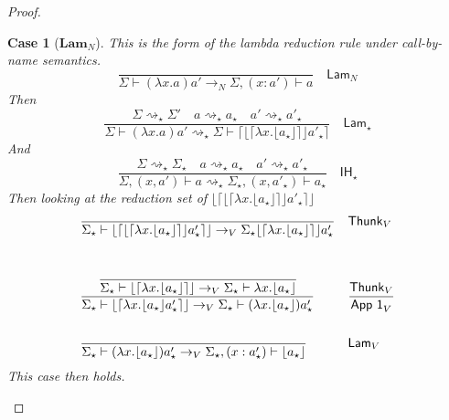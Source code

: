 \documentclass[float=false, crop=false]{standalone}
\newtheorem{case}{Case}
\numberwithin{subcase}{case}
\newcommand{\tlang}{\star}
\newcommand{\thunk}[1]{\lceil #1 \rceil}
\newcommand{\unwrap}[1]{\lfloor #1 \rfloor}
\newcommand{\tcbn}{\rightarrow_N}
\newcommand{\tcbv}{\rightarrow_V}
\newcommand{\tlthunk}{\rightsquigarrow_\tlang}
\begin{document}
\begin{proof}
  \begin{case}[$\mathbf{Lam}_N$]
    This is the form of the lambda reduction rule under call-by-name semantics.
    \[\frac{}{\Sigma \vdash (\lambda x.a)a' \tcbn \Sigma,(x:a') \vdash a }
        \quad \mathsf{Lam}_N\]
    Then \[ \frac{\Sigma \tlthunk \Sigma' \quad 
        a \tlthunk a_\tlang \quad a' \tlthunk a'_\tlang}
      {\Sigma \vdash (\lambda x .a)a' 
        \tlthunk \Sigma \vdash \thunk{\unwrap{
            \thunk{\lambda x. \unwrap{ a_\tlang}}} a'_\tlang} }
              \quad \mathsf{Lam}_\tlang\]
    And \[ \frac{\Sigma \tlthunk \Sigma_\tlang \quad a 
        \tlthunk a_\tlang \quad a' \tlthunk a'_\tlang}
      {\Sigma,(x,a') \vdash a\tlthunk \Sigma_\tlang,
        (x,a'_\tlang) \vdash a_\tlang} \quad \mathsf{IH}_\tlang \]
   Then looking at the reduction set of  
   ${\unwrap{\thunk{\unwrap{
        \thunk{\lambda x. \unwrap{ a_\tlang}}} a'_\tlang}}}$
    \begin{align*}
     &\frac{}{ 
       \Sigma_\tlang \vdash \unwrap{\thunk{\unwrap{\thunk{\lambda x.
               \unwrap{ a_\tlang}}} a'_\tlang}} \tcbv 
       \Sigma_\tlang \unwrap{\thunk{\lambda x.
               \unwrap{ a_\tlang}}} a'_\tlang} && \mathsf{Thunk}_V \\ \\
     &\cfrac{\cfrac{}{\Sigma_\tlang \vdash \unwrap{\thunk{\lambda x.
           \unwrap{ a_\tlang}}} \tcbv  \Sigma_\tlang \vdash \lambda x.
       \unwrap{a_\tlang}}}{ 
       \Sigma_\tlang \vdash \unwrap{\thunk{\lambda x.
               \unwrap{ a_\tlang} a'_\tlang}} \tcbv 
           \Sigma_\tlang \vdash (\lambda x.\unwrap{a_\tlang}) a'_\tlang} && 
         \frac{\mathsf{Thunk}_V}{\mathsf{App\ 1}_V}\\ \\
     &\frac{}{\Sigma_\tlang \vdash (\lambda x.\unwrap{a_\tlang})a'_\tlang \tcbv 
       \Sigma_\tlang, (x:a_\tlang') \vdash \unwrap{a_\tlang}} && \mathsf{Lam}_V
    \end{align*}
    This case then holds.
  \end{case}


\end{proof}
\end{document}
